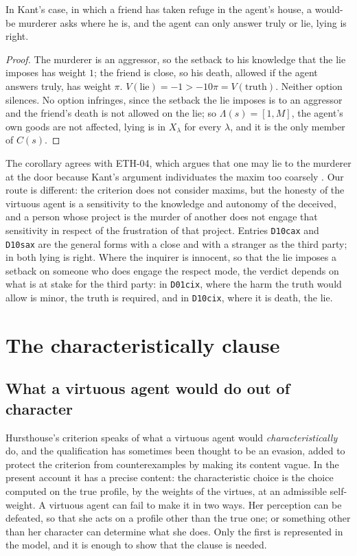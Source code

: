 \documentclass{situationist-preprint}
\newcommand{\Ch}{C}
\begin{document}
\begin{corollary}\label{c:murderer}
In Kant's case, in which a friend has taken refuge in the agent's house, a would-be murderer asks where he is, and the agent can only answer truly or lie, lying is right.
\end{corollary}

\begin{proof}
The murderer is an aggressor, so the setback to his knowledge that the lie imposes has weight $1$; the friend is close, so his death, allowed if the agent answers truly, has weight $\pi$. $V(\text{lie})=-1>-10\pi=V(\text{truth})$. Neither option silences. No option infringes, since the setback the lie imposes is to an aggressor and the friend's death is not allowed on the lie; so $\Lambda(s)=[1,M]$, the agent's own goods are not affected, lying is in $X_\lambda$ for every $\lambda$, and it is the only member of $\Ch(s)$.
\end{proof}

The corollary agrees with ETH-04, which argues that one may lie to the murderer at the door because Kant's argument individuates the maxim too coarsely \citep{Kant1797}. Our route is different: the criterion does not consider maxims, but the honesty of the virtuous agent is a sensitivity to the knowledge and autonomy of the deceived, and a person whose project is the murder of another does not engage that sensitivity in respect of the frustration of that project. Entries \texttt{D10cax} and \texttt{D10sax} are the general forms with a close and with a stranger as the third party; in both lying is right. Where the inquirer is innocent, so that the lie imposes a setback on someone who does engage the respect mode, the verdict depends on what is at stake for the third party: in \texttt{D01cix}, where the harm the truth would allow is minor, the truth is required, and in \texttt{D10cix}, where it is death, the lie.

\section{The characteristically clause}\label{s:characteristically}

\subsection{What a virtuous agent would do out of character}

Hursthouse's criterion speaks of what a virtuous agent would \emph{characteristically} do, and the qualification has sometimes been thought to be an evasion, added to protect the criterion from counterexamples by making its content vague. In the present account it has a precise content: the characteristic choice is the choice computed on the true profile, by the weights of the virtues, at an admissible self-weight. A virtuous agent can fail to make it in two ways. Her perception can be defeated, so that she acts on a profile other than the true one; or something other than her character can determine what she does. Only the first is represented in the model, and it is enough to show that the clause is needed.
\end{document}
